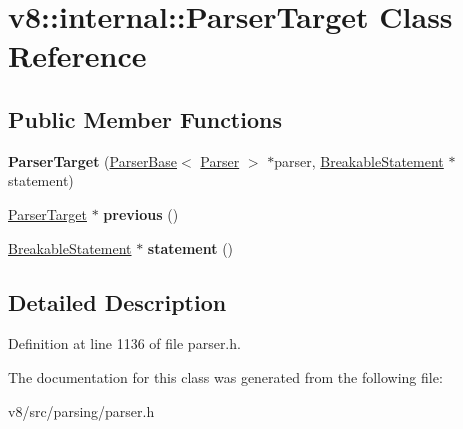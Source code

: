 \hypertarget{classv8_1_1internal_1_1ParserTarget}{}\section{v8\+:\+:internal\+:\+:Parser\+Target Class Reference}
\label{classv8_1_1internal_1_1ParserTarget}
\subsection*{Public Member Functions}
\begin{DoxyCompactItemize}
\item 
\mbox{\label{classv8_1_1internal_1_1ParserTarget_a3d216f161812113afa2aadcd409cc51e}} 
{\bfseries Parser\+Target} (\mbox{\hyperlink{classv8_1_1internal_1_1ParserBase}{Parser\+Base}}$<$ \mbox{\hyperlink{classv8_1_1internal_1_1Parser}{Parser}} $>$ $\ast$parser, \mbox{\hyperlink{classv8_1_1internal_1_1BreakableStatement}{Breakable\+Statement}} $\ast$statement)
\item 
\mbox{\label{classv8_1_1internal_1_1ParserTarget_a2ae871ed266fd5d9762468de48413ecc}} 
\mbox{\hyperlink{classv8_1_1internal_1_1ParserTarget}{Parser\+Target}} $\ast$ {\bfseries previous} ()
\item 
\mbox{\label{classv8_1_1internal_1_1ParserTarget_a7303ad089f9c06b5e5b4b894849383f8}} 
\mbox{\hyperlink{classv8_1_1internal_1_1BreakableStatement}{Breakable\+Statement}} $\ast$ {\bfseries statement} ()
\end{DoxyCompactItemize}


\subsection{Detailed Description}


Definition at line 1136 of file parser.\+h.



The documentation for this class was generated from the following file\+:\begin{DoxyCompactItemize}
\item 
v8/src/parsing/parser.\+h\end{DoxyCompactItemize}
